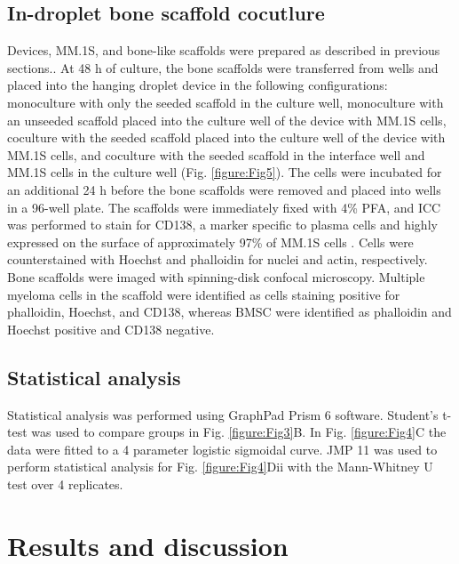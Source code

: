 \subsection{In-droplet bone scaffold cocutlure}
Devices, MM.1S, and bone-like scaffolds were prepared as described in previous sections.. At 48 h of culture, the bone scaffolds were transferred from wells and placed into the hanging droplet device in the following configurations: monoculture with only the seeded scaffold in the culture well, monoculture with an unseeded scaffold placed into the culture well of the device with MM.1S cells, coculture with the seeded scaffold placed into the culture well of the device with MM.1S cells, and coculture with the seeded scaffold in the interface well and MM.1S cells in the culture well (Fig. \ref{figure:Fig5}). The cells were incubated for an additional 24 h before the bone scaffolds were removed and placed into wells in a 96-well plate. The scaffolds were immediately fixed with 4\% PFA, and ICC was performed to stain for CD138, a marker specific to plasma cells and highly expressed on the surface of approximately 97\% of MM.1S cells \cite{Paino2014}. Cells were counterstained with Hoechst and phalloidin for nuclei and actin, respectively. Bone scaffolds were imaged with spinning-disk confocal microscopy. Multiple myeloma cells in the scaffold were identified as cells staining positive for phalloidin, Hoechst, and CD138, whereas BMSC were identified as phalloidin and Hoechst positive and CD138 negative.


\subsection{Statistical analysis}
Statistical analysis was performed using GraphPad Prism 6 software. Student’s t-test was used to compare groups in Fig. \ref{figure:Fig3}B.  In Fig. \ref{figure:Fig4}C the data were fitted to a 4 parameter logistic sigmoidal curve. JMP 11 was used to perform statistical analysis for Fig.  \ref{figure:Fig4}Dii with the Mann-Whitney U test over 4 replicates.

\section{Results and discussion}
